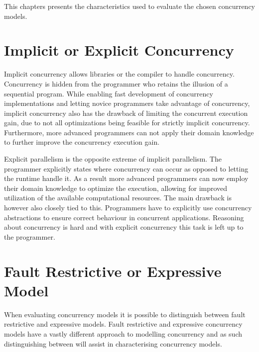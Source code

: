  \makeatletter {}\makeatother
{}
This chapters presents the characteristics used to evaluate the chosen concurrency models.
\label{chap:char}
\section{Implicit or Explicit Concurrency}
Implicit concurrency allows libraries or the compiler to handle concurrency. Concurrency is hidden from the programmer who retains the illusion of a sequential program\cite[p. 59]{sutter2005software}. While enabling fast development of concurrency implementations and letting novice programmers take advantage of concurrency, implicit concurrency also has the drawback of limiting the concurrent execution gain, due to not all optimizations being feasible for strictly implicit concurrency. Furthermore, more advanced programmers can not apply their domain knowledge to further improve the concurrency execution gain.

Explicit parallelism is the opposite extreme of implicit parallelism. The programmer explicitly states where concurrency can occur as opposed to letting the runtime handle it\cite[p. 59]{sutter2005software}. As a result more advanced programmers can now employ their domain knowledge to optimize the execution, allowing for improved utilization of the available computational resources. The main drawback is however also closely tied to this. Programmers have to explicitly use concurrency abstractions to ensure correct behaviour in concurrent applications. Reasoning about concurrency is hard\cite[p. 56]{sutter2005software} and with explicit concurrency this task is left up to the programmer.

\section{Fault Restrictive or Expressive Model}
When evaluating concurrency models it is possible to distinguish between fault restrictive and expressive models. Fault restrictive and expressive concurrency models have a vastly different approach to modelling concurrency and as such distinguishing between will assist in characterising concurrency models. 

